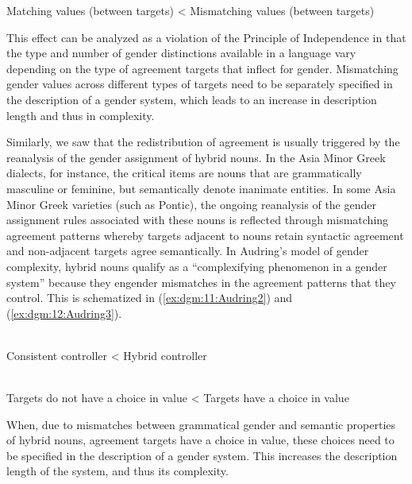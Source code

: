 \documentclass[output=collectionpaper]{langsci/langscibook}
\begin{document}
\vspace{3mm}
Matching values (between targets) {\textless} Mismatching values (between targets)

\z

This effect can be analyzed as a violation of the Principle of Independence in that the type and number of gender distinctions available in a language vary depending on the type of agreement targets that inflect for gender.  Mismatching gender values across different types of targets need to be separately specified in the description of a gender system, which leads to an increase in description length and thus in complexity.

Similarly, we saw that the redistribution of agreement is usually triggered by the reanalysis of the gender assignment of hybrid nouns. In the Asia Minor Greek dialects, for instance, the critical items are nouns that are grammatically masculine or feminine, but semantically denote inanimate entities. In some Asia Minor Greek varieties (such as Pontic), the ongoing reanalysis of the gender assignment rules associated with these nouns is reflected through mismatching agreement patterns whereby targets adjacent to nouns retain syntactic agreement and non-adjacent targets agree semantically. In Audring's model of gender complexity, hybrid nouns qualify as a ``complexifying phenomenon in a gender system'' because they engender mismatches in the agreement patterns that they control. This is schematized in (\ref{ex:dgm:11:Audring2}) and (\ref{ex:dgm:12:Audring3}).

\ea\label{ex:dgm:11:Audring2}
\\

\vspace{3mm}
Consistent controller {\textless} Hybrid controller
\z

\ea\label{ex:dgm:12:Audring3}
\\

\vspace{3mm}
Targets do not have a choice in value {\textless} Targets have a choice in value
\z

When, due to mismatches between grammatical gender and semantic properties of hybrid nouns, agreement targets have a choice in value, these choices need to be specified in the description of a gender system. This increases the description length of the system, and thus its complexity.
\end{document}

